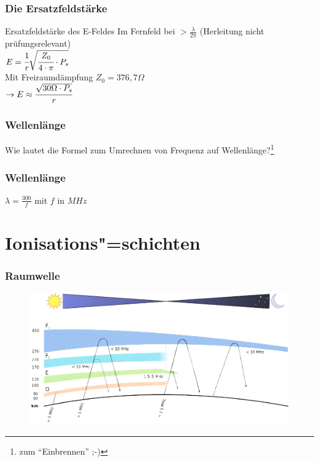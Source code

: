 \begin{frame}
  \frametitle{Die Ersatzfeldstärke}
  \begin{block}{Ersatzfeldstärke des E-Feldes}
    Im Fernfeld bei $> \frac{\lambda}{2\pi}$ (Herleitung nicht prüfungsrelevant)\\[1em]
    $E = \cfrac{1}{r} \sqrt{\cfrac{Z_0}{4 \cdot \pi} \cdot P_s}$ \\[1em]
    Mit Freiraumdämpfung $Z_0 = 376,7 \Omega $\\[1em]
    $\rightarrow E \approx \cfrac{\sqrt{30 \Omega \cdot P_s}}{r} $ \\[1em]
  \end{block}
\end{frame}


\begin{frame}
  \frametitle{Wellenlänge}
  \begin{center}
    \huge Wie lautet die Formel zum Umrechnen von Frequenz auf
    Wellenlänge?\footnote{zum ``Einbrennen'' ;-)}
  \end{center}
\end{frame}

\begin{frame}
  \frametitle{Wellenlänge}
  \begin{center}
    \huge $\lambda = \frac{300}{f}$ mit $f$ in $MHz$
  \end{center}
\end{frame}

\section*{Ionisations"=schichten}

\begin{frame}
  \frametitle{Raumwelle}
  \begin{center}
    \begin{figure}
      \includegraphics[width=.9\textwidth,height=.85\textheight,keepaspectratio]{a08/schichten_behelf_43.png}
    \end{figure}
  \end{center}
\end{frame}

